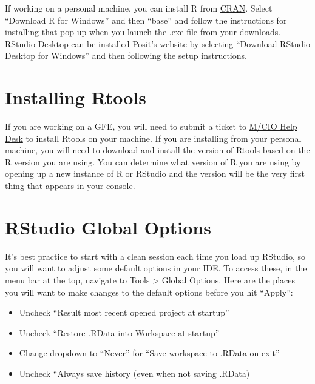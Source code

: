 \documentclass[
  letterpaper,
  DIV=11,
  numbers=noendperiod]{scrreprt}
\providecommand{\tightlist}{%
  \setlength{\itemsep}{0pt}\setlength{\parskip}{0pt}}\usepackage{longtable,booktabs,array}
\begin{document}
If working on a personal machine, you can install R from
\href{https://cran.r-project.org/}{CRAN}. Select ``Download R for
Windows'' and then ``base'' and follow the instructions for installing
that pop up when you launch the .exe file from your downloads. RStudio
Desktop can be installed
\href{https://posit.co/download/rstudio-desktop/}{Posit's website} by
selecting ``Download RStudio Desktop for Windows'' and then following
the setup instructions.

\hypertarget{installing-rtools}{%
\section{Installing Rtools}\label{installing-rtools}}

If you are working on a GFE, you will need to submit a ticket to
\href{CIO-HELPDESK@usaid.gov}{M/CIO Help Desk} to install Rtools on your
machine. If you are installing from your personal machine, you will need
to \href{https://cran.r-project.org/bin/windows/Rtools/}{download} and
install the version of Rtools based on the R version you are using. You
can determine what version of R you are using by opening up a new
instance of R or RStudio and the version will be the very first thing
that appears in your console.

\hypertarget{rstudio-global-options}{%
\section{RStudio Global Options}\label{rstudio-global-options}}

It's best practice to start with a clean session each time you load up
RStudio, so you will want to adjust some default options in your IDE. To
access these, in the menu bar at the top, navigate to Tools
\textgreater{} Global Options. Here are the places you will want to make
changes to the default options before you hit ``Apply'':

\begin{itemize}
\tightlist
\item
  Uncheck ``Result most recent opened project at startup''
\item
  Uncheck ``Restore .RData into Workspace at startup''
\item
  Change dropdown to ``Never'' for ``Save workspace to .RData on exit''
\item
  Uncheck ``Always save history (even when not saving .RData)
\end{itemize}
\end{document}
